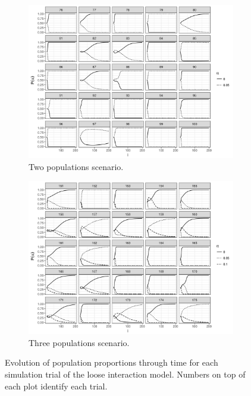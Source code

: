 \documentclass[a4paper]{article}
\begin{document}
\begin{figure}
  \centering
  \begin{subfigure}[]{.9\textwidth}
    \includegraphics[width=\textwidth]{simulation/results/round-3/plots/proportion-cases-0-005-weakest-square.png}
    \caption{Two populations scenario.}
    \label{fig:proportion-cases-two-loose-interaction}
  \end{subfigure}
  \hfill
  \begin{subfigure}[]{.9\textwidth}
    \includegraphics[width=\textwidth]{simulation/results/round-3/plots/proportion-cases-0-005-01-weakest-square.png}
    \caption{Three populations scenario.}
    \label{fig:proportion-cases-three-loose-interaction}
  \end{subfigure}
  \caption{Evolution of population proportions through time for each simulation trial of the loose interaction model. Numbers on top of each plot identify each trial.}
  \label{fig:proportion-cases-loose-interaction}
\end{figure}
\end{document}
